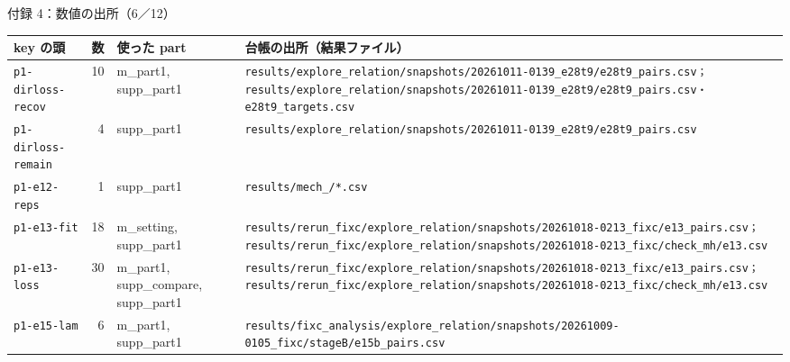 \begin{frame}{付録 4：数値の出所（6／12）}
  \vspace{-0.3em}\centering\tiny\renewcommand{\arraystretch}{1.0}
  \begin{tabularx}{\textwidth}{@{}l r l X@{}}
    \toprule key の頭 & 数 & 使った part & 台帳の出所（結果ファイル） \\ \midrule
    \texttt{p1-dirloss-recov} & 10 & m\_part1, supp\_part1 & \texttt{results/\allowbreak{}explore\_\allowbreak{}relation/\allowbreak{}snapshots/\allowbreak{}20261011-0139\_\allowbreak{}e28t9/\allowbreak{}e28t9\_\allowbreak{}pairs.csv；results/\allowbreak{}explore\_\allowbreak{}relation/\allowbreak{}snapshots/\allowbreak{}20261011-0139\_\allowbreak{}e28t9/\allowbreak{}e28t9\_\allowbreak{}pairs.csv・e28t9\_\allowbreak{}targets.csv} \\
    \texttt{p1-dirloss-remain} & 4 & supp\_part1 & \texttt{results/\allowbreak{}explore\_\allowbreak{}relation/\allowbreak{}snapshots/\allowbreak{}20261011-0139\_\allowbreak{}e28t9/\allowbreak{}e28t9\_\allowbreak{}pairs.csv} \\
    \texttt{p1-e12-reps} & 1 & supp\_part1 & \texttt{results/\allowbreak{}mech\_\allowbreak{}{audio\_\allowbreak{}wavlm,audio\_\allowbreak{}hubert,video}/\allowbreak{}*.csv} \\
    \texttt{p1-e13-fit} & 18 & m\_setting, supp\_part1 & \texttt{results/\allowbreak{}rerun\_\allowbreak{}fixc/\allowbreak{}explore\_\allowbreak{}relation/\allowbreak{}snapshots/\allowbreak{}20261018-0213\_\allowbreak{}fixc/\allowbreak{}e13\_\allowbreak{}pairs.csv；results/\allowbreak{}rerun\_\allowbreak{}fixc/\allowbreak{}explore\_\allowbreak{}relation/\allowbreak{}snapshots/\allowbreak{}20261018-0213\_\allowbreak{}fixc/\allowbreak{}check\_\allowbreak{}mh/\allowbreak{}e13.csv} \\
    \texttt{p1-e13-loss} & 30 & m\_part1, supp\_compare, supp\_part1 & \texttt{results/\allowbreak{}rerun\_\allowbreak{}fixc/\allowbreak{}explore\_\allowbreak{}relation/\allowbreak{}snapshots/\allowbreak{}20261018-0213\_\allowbreak{}fixc/\allowbreak{}e13\_\allowbreak{}pairs.csv；results/\allowbreak{}rerun\_\allowbreak{}fixc/\allowbreak{}explore\_\allowbreak{}relation/\allowbreak{}snapshots/\allowbreak{}20261018-0213\_\allowbreak{}fixc/\allowbreak{}check\_\allowbreak{}mh/\allowbreak{}e13.csv} \\
    \texttt{p1-e15-lam} & 6 & m\_part1, supp\_part1 & \texttt{results/\allowbreak{}fixc\_\allowbreak{}analysis/\allowbreak{}explore\_\allowbreak{}relation/\allowbreak{}snapshots/\allowbreak{}20261009-0105\_\allowbreak{}fixc/\allowbreak{}stageB/\allowbreak{}e15b\_\allowbreak{}pairs.csv} \\

\end{tabularx}
\end{frame}
